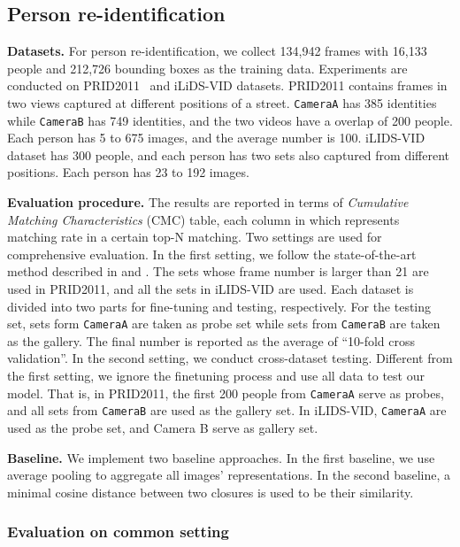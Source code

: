 \documentclass[10pt,twocolumn,letterpaper]{article}
\begin{document}
\subsection{Person re-identification}
\textbf{Datasets.} For person re-identification, we collect 134,942 frames with 16,133 people and 212,726 bounding boxes as the training data. Experiments are conducted on PRID2011~\cite{hirzer11a} and iLiDS-VID\cite{wang2014person} datasets. PRID2011 contains frames in two views captured at different positions of a street. \texttt{CameraA} has 385 identities while \texttt{CameraB} has 749 identities, and the two videos have a overlap of 200 people. Each person has 5 to 675 images, and the average number is 100. iLIDS-VID dataset has 300 people, and each person has two sets also captured from different positions. Each person has 23 to 192 images.

\textbf{Evaluation procedure.}
The results are reported in terms of \emph{Cumulative Matching Characteristics} (CMC) table, each column in which represents matching rate in a certain top-N matching.
Two settings are used for comprehensive evaluation. In the first setting, we follow the state-of-the-art method described in \cite{you2016top} and \cite{wang2016person}. The sets whose frame number is larger than 21 are used in PRID2011, and all the sets in iLIDS-VID are used. Each dataset is divided into two parts for fine-tuning and testing, respectively. For the testing set, sets form \texttt{CameraA} are taken as probe set while sets from \texttt{CameraB} are taken as the gallery. The final number is reported as the average of ``10-fold cross validation''. In the second setting, we conduct cross-dataset  testing. Different from the first setting, we ignore the finetuning process and use all data to test our model. That is, in PRID2011, the first 200 people from \texttt{CameraA} serve as probes, and all sets from \texttt{CameraB} are used as the gallery set. In iLIDS-VID,  \texttt{CameraA} are used as the probe set, and Camera B serve as gallery set.

\textbf{Baseline.}
We implement two baseline approaches. In the first baseline, we use average pooling to aggregate all images' representations. In the second baseline, a minimal cosine distance between two closures is used to be their similarity.

\subsubsection{Evaluation on common setting}
\end{document}
